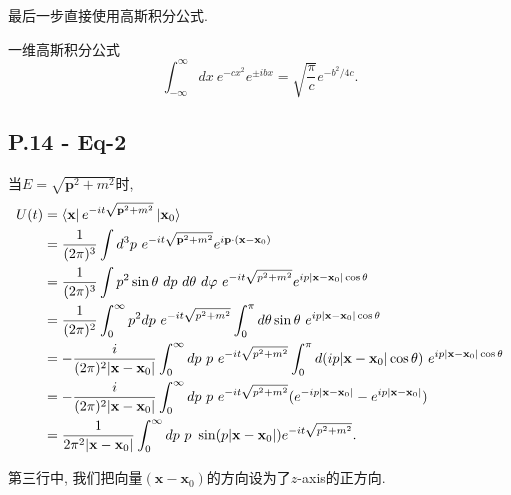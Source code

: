 最后一步直接使用高斯积分公式.

\begin{mybox}{一维高斯积分公式}
  \begin{equation}
    \int_{-\infty}^{\infty}dx\ e^{-cx^2}e^{\pm ibx} = \sqrt{\frac{\pi}{c}}e^{-b^2/4c}.
  \end{equation}
\end{mybox}

\subsection{P.14 - Eq-2}

当$E = \sqrt{\mathbf{p}^2+m^2}$时,
\begin{equation}
  \begin{aligned}
    U(t) & = \mathinner{\langle \mathbf{x}|}e^{-it\sqrt{\mathbf{p}^2+m^2}}\mathinner{|\mathbf{x}_0\rangle}                                                                                            \\
         & = \frac{1}{(2\pi)^3} \int d^3p \ e^{-it\sqrt{\mathbf{p}^2+m^2}} e^{i\mathbf{p}\cdot(\mathbf{x}-\mathbf{x}_0)}                                                                              \\
         & = \frac{1}{(2\pi)^3} \int p^2\sin\theta\ dp\ d\theta\ d\varphi \ e^{-it\sqrt{p^2+m^2}} e^{ip|\mathbf{x}-\mathbf{x}_0|\cos\theta}                                                              \\
         & = \frac{1}{(2\pi)^2} \int_0^\infty p^2 dp \ e^{-it\sqrt{p^2+m^2}} \int_0^\pi d\theta \sin\theta \ e^{ip|\mathbf{x}-\mathbf{x}_0|\cos\theta}                                                \\
         & = -\frac{i}{(2\pi)^2|\mathbf{x}-\mathbf{x}_0|} \int_0^\infty dp \ p\ e^{-it\sqrt{p^2+m^2}} \int_0^\pi d(ip|\mathbf{x}-\mathbf{x}_0|\cos\theta) \ e^{ip|\mathbf{x}-\mathbf{x}_0|\cos\theta} \\
         & = -\frac{i}{(2\pi)^2|\mathbf{x}-\mathbf{x}_0|} \int_0^\infty dp \ p\ e^{-it\sqrt{p^2+m^2}} (e^{-ip|\mathbf{x}-\mathbf{x}_0|}-e^{ip|\mathbf{x}-\mathbf{x}_0|})                              \\
         & = \frac{1}{2\pi^2|\mathbf{x}-\mathbf{x}_0|} \int_0^\infty dp \ p\ \sin(p|\mathbf{x}-\mathbf{x}_0|) e^{-it\sqrt{p^2+m^2}}.
  \end{aligned}
\end{equation}

第三行中, 我们把向量$(\mathbf{x}-\mathbf{x}_0)$的方向设为了$z$-axis的正方向.

